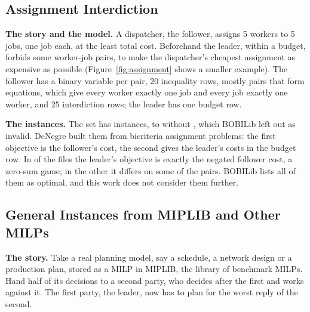 \subsection{Assignment Interdiction}\label{sec:prob-assignment}

\textbf{The story and the model.} A dispatcher, the follower, assigns 5 workers to 5 jobs, one
job each, at the least total cost. Beforehand the leader, within a budget, forbids some
worker-job pairs, to make the dispatcher's cheapest assignment as expensive as possible
(Figure~\ref{fig:assignment} shows a smaller example). The follower has a binary variable per pair,
20 inequality rows, mostly pairs that form equations, which give every worker exactly one job and
every job exactly one worker, and 25 interdiction rows; the leader has one budget row.

\textbf{The instances.} The set  has \FamAssignmentAll{} instances,
 to  without , which BOBILib left out as invalid. DeNegre
built them from bicriteria assignment problems:\cite{denegre2011thesis} the first objective is
the follower's cost, the second gives the leader's costs in the budget row. In \NumAssignNegated{} of the files
the leader's objective is exactly the negated follower cost, a zero-sum game; in the other
\NumAssignOther{} it differs on some of the pairs.
BOBILib lists all of them as optimal, and this work does not consider them further.

\subsection{General Instances from MIPLIB and Other MILPs}\label{sec:prob-general}

\textbf{The story.} Take a real planning model, say a schedule, a network design or a
production plan, stored as a MILP in MIPLIB, the library of benchmark MILPs.
Hand half of its decisions to a second party, who decides after the first and works against
it. The first party, the leader, now has to plan for the worst reply of the second.

